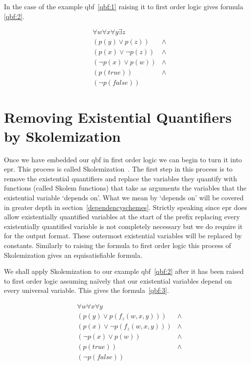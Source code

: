 In the case of the example \gls{qbf}~\ref{qbf:1} raising it to first order logic gives formula \ref{qbf:2}.

\begin{equation} \label{qbf:2}
\begin{aligned}
&\forall w \forall x \forall y \exists z\\
&(p(y) \lor p(z)) &\land\\
&(p(x) \lor \neg p(z)) &\land\\
&(\neg p(x) \lor p(w)) &\land\\
&(p(true)) &\land\\
&(\neg p(false))
\end{aligned}
\end{equation}

\section{Removing Existential Quantifiers by Skolemization} \label{skolemization}
Once we have embedded our \gls{qbf} in first order logic we can begin to turn it into \gls{epr}. This process is called Skolemization~\cite{skolem1967logisch}. The first step in this process is to remove the existential quantifiers and replace the variables they quantify with functions (called Skolem functions) that take as arguments the variables that the existential variable `depends on'. What we mean by `depends on' will be covered in greater depth in section~\ref{dependencyschemes}. Strictly speaking since \gls{epr} does allow existentially quantified variables at the start of the prefix replacing every existentially quantified variable is not completely necessary but we do require it for the output format. These outermost existential variables will be replaced by constants. Similarly to raising the formula to first order logic this process of Skolemization gives an equisatisfiable formula.

We shall apply Skolemization to our example \gls{qbf}~\ref{qbf:2} after it has been raised to first order logic assuming na{\"i}vely that our existential variables depend on every universal variable. This gives the formula~\ref{qbf:3}.

\begin{equation} \label{qbf:3}
\begin{aligned}
&\forall w \forall x \forall y\\
&(p(y) \lor p(f_z(w, x, y))) &\land\\
&(p(x) \lor \neg p(f_z(w, x, y))) &\land\\
&(\neg p(x) \lor p(w)) &\land\\
&(p(true)) &\land\\
&(\neg p(false))
\end{aligned}
\end{equation}

